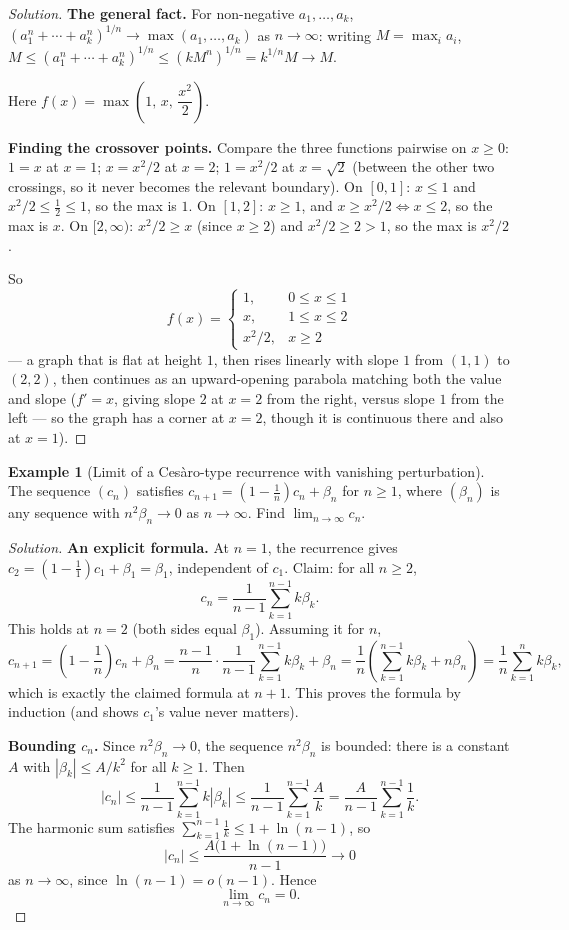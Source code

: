 \documentclass[11pt]{article}
\theoremstyle{definition}
\newtheorem{example}{Example}[section]
\begin{document}
\begin{proof}[Solution]
\textbf{The general fact.} For non-negative $a_1,\dots,a_k$, $\left(a_1^n+\cdots+a_k^n\right)^{1/n}\to\max(a_1,\dots,a_k)$ as $n\to\infty$: writing $M=\max_ia_i$, $M\le(a_1^n+\cdots+a_k^n)^{1/n}\le(kM^n)^{1/n}=k^{1/n}M\to M$.

Here $f(x)=\max\!\left(1,\,x,\,\dfrac{x^2}2\right)$.

\textbf{Finding the crossover points.} Compare the three functions pairwise on $x\ge0$: $1=x$ at $x=1$; $x=x^2/2$ at $x=2$; $1=x^2/2$ at $x=\sqrt2$ (between the other two crossings, so it never becomes the relevant boundary). On $[0,1]$: $x\le1$ and $x^2/2\le\tfrac12\le1$, so the max is $1$. On $[1,2]$: $x\ge1$, and $x\ge x^2/2\iff x\le2$, so the max is $x$. On $[2,\infty)$: $x^2/2\ge x$ (since $x\ge2$) and $x^2/2\ge2>1$, so the max is $x^2/2$.

So
\[
\boxed{f(x)=\begin{cases}1,& 0\le x\le1\\ x,& 1\le x\le2\\ x^2/2,& x\ge2\end{cases}}
\]
— a graph that is flat at height $1$, then rises linearly with slope $1$ from $(1,1)$ to $(2,2)$, then continues as an upward-opening parabola matching both the value and slope ($f'=x$, giving slope $2$ at $x=2$ from the right, versus slope $1$ from the left — so the graph has a corner at $x=2$, though it is continuous there and also at $x=1$).
\end{proof}

\begin{example}[Limit of a Cesàro-type recurrence with vanishing perturbation]
The sequence $(c_n)$ satisfies $c_{n+1}=\left(1-\frac1n\right)c_n+\beta_n$ for $n\ge1$, where $(\beta_n)$ is any sequence with $n^2\beta_n\to0$ as $n\to\infty$. Find $\lim_{n\to\infty}c_n$.
\end{example}
\begin{proof}[Solution]
\textbf{An explicit formula.} At $n=1$, the recurrence gives $c_2=\left(1-\frac11\right)c_1+\beta_1=\beta_1$, independent of $c_1$. Claim: for all $n\ge2$,
\[
c_n=\frac{1}{n-1}\sum_{k=1}^{n-1}k\beta_k.
\]
This holds at $n=2$ (both sides equal $\beta_1$). Assuming it for $n$,
\[
c_{n+1}=\left(1-\frac1n\right)c_n+\beta_n=\frac{n-1}{n}\cdot\frac1{n-1}\sum_{k=1}^{n-1}k\beta_k+\beta_n=\frac1n\left(\sum_{k=1}^{n-1}k\beta_k+n\beta_n\right)=\frac1n\sum_{k=1}^{n}k\beta_k,
\]
which is exactly the claimed formula at $n+1$. This proves the formula by induction (and shows $c_1$'s value never matters).

\textbf{Bounding $c_n$.} Since $n^2\beta_n\to0$, the sequence $n^2\beta_n$ is bounded: there is a constant $A$ with $|\beta_k|\le A/k^2$ for all $k\ge1$. Then
\[
|c_n|\le\frac1{n-1}\sum_{k=1}^{n-1}k|\beta_k|\le\frac1{n-1}\sum_{k=1}^{n-1}\frac{A}{k}=\frac{A}{n-1}\sum_{k=1}^{n-1}\frac1k.
\]
The harmonic sum satisfies $\sum_{k=1}^{n-1}\frac1k\le1+\ln(n-1)$, so
\[
|c_n|\le\frac{A\bigl(1+\ln(n-1)\bigr)}{n-1}\longrightarrow0
\]
as $n\to\infty$, since $\ln(n-1)=o(n-1)$. Hence
\[
\boxed{\lim_{n\to\infty}c_n=0}.
\]
\end{proof}
\end{document}

